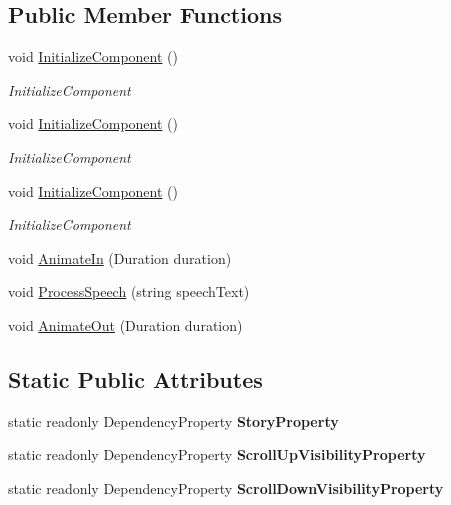 \subsection*{Public Member Functions}
\begin{DoxyCompactItemize}
\item 
void \hyperlink{class_microsoft_1_1_samples_1_1_kinect_1_1_basic_interactions_1_1_story_control_a4e6d9e895b7a40f9862473b812c0f120}{Initialize\-Component} ()
\begin{DoxyCompactList}\small\item\em Initialize\-Component \end{DoxyCompactList}\item 
void \hyperlink{class_microsoft_1_1_samples_1_1_kinect_1_1_basic_interactions_1_1_story_control_a4e6d9e895b7a40f9862473b812c0f120}{Initialize\-Component} ()
\begin{DoxyCompactList}\small\item\em Initialize\-Component \end{DoxyCompactList}\item 
void \hyperlink{class_microsoft_1_1_samples_1_1_kinect_1_1_basic_interactions_1_1_story_control_a4e6d9e895b7a40f9862473b812c0f120}{Initialize\-Component} ()
\begin{DoxyCompactList}\small\item\em Initialize\-Component \end{DoxyCompactList}\item 
void \hyperlink{class_microsoft_1_1_samples_1_1_kinect_1_1_basic_interactions_1_1_story_control_a1617d2b5ca03477335c892583e4e6645}{Animate\-In} (Duration duration)
\item 
void \hyperlink{class_microsoft_1_1_samples_1_1_kinect_1_1_basic_interactions_1_1_story_control_aabc92a763491a4264fe23340887542c1}{Process\-Speech} (string speech\-Text)
\item 
void \hyperlink{class_microsoft_1_1_samples_1_1_kinect_1_1_basic_interactions_1_1_story_control_a3bc2edddf7bccdc848e6fe9ca087a44d}{Animate\-Out} (Duration duration)
\end{DoxyCompactItemize}
\subsection*{Static Public Attributes}
\begin{DoxyCompactItemize}
\item 
static readonly Dependency\-Property {\bfseries Story\-Property}
\item 
static readonly Dependency\-Property {\bfseries Scroll\-Up\-Visibility\-Property}
\item 
static readonly Dependency\-Property {\bfseries Scroll\-Down\-Visibility\-Property}
\end{DoxyCompactItemize}
